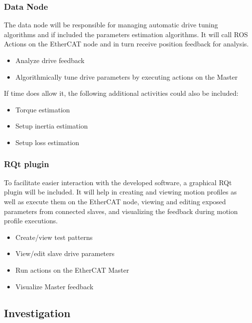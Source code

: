 \subsubsection{Data Node}

The data node will be responsible for managing automatic drive tuning algorithms and if included the parameters estimation algorithms. 
It will call ROS Actions on the EtherCAT node and in turn receive position feedback for analysis. 

\begin{itemize}
	\setlength\itemsep{\pdescitemsep}
	\item Analyze drive feedback
	\item Algorithmically tune drive parameters by executing actions on the Master
\end{itemize}

\noindent
If time does allow it, the following additional activities could also be included:

\begin{itemize}
	\setlength\itemsep{\pdescitemsep}
	\item Torque estimation
	\item Setup inertia estimation
	\item Setup loss estimation
\end{itemize}

\subsubsection{RQt plugin}

To facilitate easier interaction with the developed software, a graphical RQt plugin will be included. 
It will help in creating and viewing motion profiles as well as execute them on the EtherCAT node, viewing and editing exposed parameters from connected slaves, and visualizing the feedback during motion profile executions. 

\begin{itemize}
	\setlength\itemsep{\pdescitemsep}
	\item Create/view test patterns
	\item View/edit slave drive parameters
	\item Run actions on the EtherCAT Master
	\item Visualize Master feedback
\end{itemize}

\subsection{Investigation}

